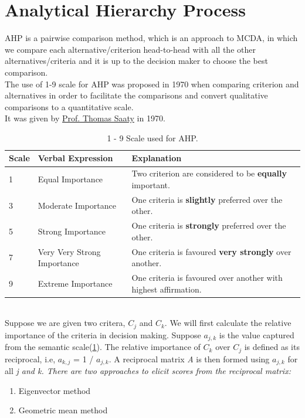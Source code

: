 \documentclass[10pt, a4paper]{article}
\begin{document}
\section{Analytical Hierarchy Process}
 \noindent AHP is a pairwise comparison method, which is an approach to MCDA, in which we compare each alternative/criterion head-to-head with all the other alternatives/criteria and it is up to the decision maker to choose the best comparison.\\
 The use of 1-9 scale for AHP was proposed in 1970 when comparing criterion and alternatives in order to facilitate the comparisons and convert qualitative comparisons to a quantitative scale.\\
 It was given by \href{https://en.wikipedia.org/wiki/Thomas_L._Saaty}{Prof. Thomas Saaty} in 1970. \\
\begin{table}[h]
\setlength{\arrayrulewidth}{0.25mm}
\setlength{\tabcolsep}{18pt}
\begin{tabular}{ |p{1cm}|p{3cm}|p{5cm}|  }
\hline
\textbf{Scale}& \textbf{Verbal Expression} &\textbf{Explanation} \\
\hline
1 & Equal Importance & Two criterion are considered to be \textbf{equally} important. \\
\hline
3 & Moderate Importance & One criteria is \textbf{slightly} preferred over the other. \\
\hline
5 & Strong Importance & One criteria is \textbf{strongly} preferred over the other. \\
\hline
7 & Very Very Strong Importance & One criteria is favoured \textbf{very strongly} over another. \\
\hline
9 & Extreme Importance & One criteria is favoured over another with highest affirmation. \\
\hline
\end{tabular}
\caption{\label{tab:table1}1 - 9 Scale used for AHP.}
\end{table} \\
Suppose we are given two critera, $C_j$ and $C_k$. We will first calculate the relative importance of the criteria in decision making. Suppose $a_{j,k}$ is the value captured from the semantic scale(\ref{tab:table1}). The relative importance of $C_k$ over $C_j$ is defined as its reciprocal, i.e, $a_{k,j}$ = 1 / $a_{j,k}$.
A reciprocal matrix {\em A} is then formed using $a_{j,k}$ for all \em j and \em k.
There are two approaches to elicit scores from the reciprocal matrix:
\begin{enumerate}[noitemsep]
    \item Eigenvector method
    \item Geometric mean method
\end{enumerate}
\end{document}
